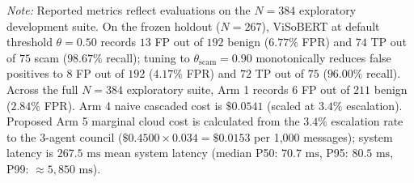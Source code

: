 \documentclass[journal]{IEEEtran}
\begin{document}
\begin{table}[t]
\centering
\caption{Comparative End-to-End System Benchmark Across Architectural Arms ($N=384$ Combined Development Samples, $\tau=0.90$)}
\label{tab:e2e_benchmark}
\renewcommand{\arraystretch}{0.92}
\par\vspace{6pt}
\parbox{\textwidth}{\footnotesize \textit{Note:} Reported metrics reflect evaluations on the $N=384$ exploratory development suite. On the frozen holdout ($N=267$), ViSoBERT at default threshold $\theta = 0.50$ records $13$ FP out of $192$ benign ($6.77\%$ FPR) and $74$ TP out of $75$ scam ($98.67\%$ recall); tuning to $\theta_{\text{scam}} = 0.90$ monotonically reduces false positives to $8$ FP out of $192$ ($4.17\%$ FPR) and $72$ TP out of $75$ ($96.00\%$ recall). Across the full $N=384$ exploratory suite, Arm 1 records $6$ FP out of $211$ benign ($2.84\%$ FPR). Arm 4 naive cascaded cost is $\$0.0541$ (scaled at $3.4\%$ escalation). Proposed Arm 5 marginal cloud cost is calculated from the $3.4\%$ escalation rate to the 3-agent council ($\$0.4500 \times 0.034 = \$0.0153$ per 1,000 messages); system latency is $267.5\text{ ms}$ mean system latency (median P50: $70.7\text{ ms}$, P95: $80.5\text{ ms}$, P99: $\approx 5,850\text{ ms}$).}
\end{table}
\end{document}
